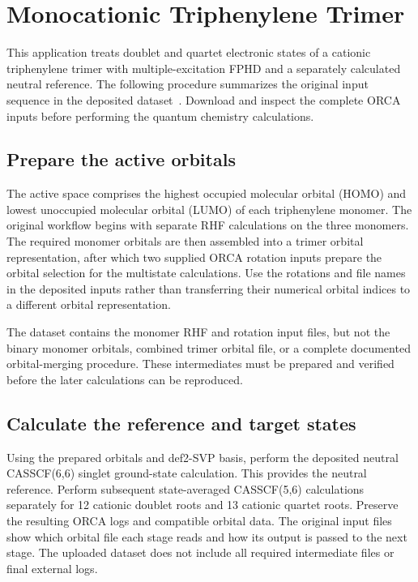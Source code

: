 \section{Monocationic Triphenylene Trimer}\label{sec-tut-cationic}
This application treats doublet and quartet electronic states of a cationic triphenylene trimer with multiple-excitation FPHD and a separately calculated neutral reference. The following procedure summarizes the original input sequence in the deposited dataset~\cite{DiabatPaperData2026}. Download and inspect the complete ORCA inputs before performing the quantum chemistry calculations.

\subsection{Prepare the active orbitals}
The active space comprises the highest occupied molecular orbital (HOMO) and lowest unoccupied molecular orbital (LUMO) of each triphenylene monomer. The original workflow begins with separate RHF calculations on the three monomers. The required monomer orbitals are then assembled into a trimer orbital representation, after which two supplied ORCA rotation inputs prepare the orbital selection for the multistate calculations. Use the rotations and file names in the deposited inputs rather than transferring their numerical orbital indices to a different orbital representation.

The dataset contains the monomer RHF and rotation input files, but not the binary monomer orbitals, combined trimer orbital file, or a complete documented orbital-merging procedure. These intermediates must be prepared and verified before the later calculations can be reproduced.

\subsection{Calculate the reference and target states}
Using the prepared orbitals and def2-SVP basis, perform the deposited neutral CASSCF(6,6) singlet ground-state calculation. This provides the neutral reference. Perform subsequent state-averaged CASSCF(5,6) calculations separately for 12 cationic doublet roots and 13 cationic quartet roots.
Preserve the resulting ORCA logs and compatible orbital data. The original input files show which orbital file each stage reads and how its output is passed to the next stage. The uploaded dataset does not include all required intermediate files or final external logs.

